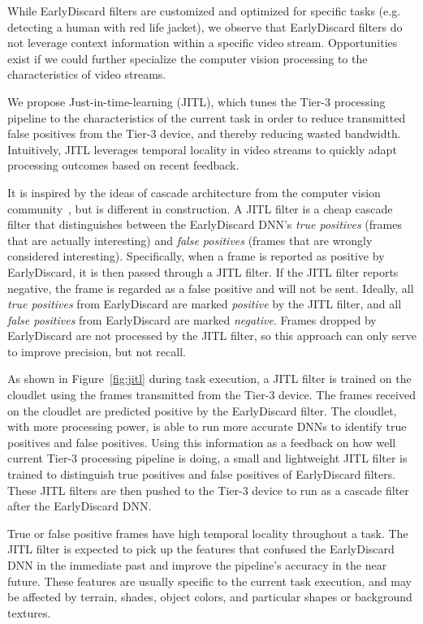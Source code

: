 While EarlyDiscard filters are customized and optimized for specific tasks (e.g.
detecting a human with red life jacket), we observe that EarlyDiscard filters do
not leverage context information within a specific video stream. Opportunities
exist if we could further specialize the computer vision processing to the
characteristics of video streams.

We propose Just-in-time-learning  (JITL), which tunes the Tier-3 processing
pipeline to the characteristics of the current task in order to reduce
transmitted false positives from the Tier-3 device, and thereby reducing wasted
bandwidth.  Intuitively, JITL leverages temporal locality in video streams to
quickly adapt processing outcomes based on recent feedback.

It is inspired by the ideas of cascade architecture from the computer vision
community~\cite{Viola2001}, but is different in construction. A JITL filter is a
cheap cascade filter that distinguishes between the EarlyDiscard DNN's
\emph{true positives} (frames that are actually interesting) and \emph{false
    positives} (frames that are wrongly considered interesting). Specifically, when
a frame is reported as positive by EarlyDiscard, it is then passed through a
JITL filter. If the JITL filter reports negative, the frame is regarded as a
false positive and will not be sent. Ideally, all \emph{true positives} from
EarlyDiscard are marked \emph{positive} by the JITL filter, and all \emph{false
    positives} from EarlyDiscard are marked \emph{negative}.  Frames dropped by
EarlyDiscard are not processed by the JITL filter, so this approach can only
serve to improve precision, but not recall.

As shown in Figure~\ref{fig:jitl} during task execution, a JITL filter is
trained on the cloudlet using the frames transmitted from the Tier-3 device.
The frames received on the cloudlet are predicted positive by the EarlyDiscard
filter. The cloudlet, with more processing power, is able to run more accurate
DNNs to identify true positives and false positives. Using this information as a
feedback on how well current Tier-3 processing pipeline is doing, a small and
lightweight JITL filter is trained to distinguish true positives and false
positives of EarlyDiscard filters. These JITL filters are then pushed to the
Tier-3 device to run as a cascade filter after the EarlyDiscard DNN.

True or false positive frames have high temporal locality throughout a task. The
JITL filter is expected to pick up the features that confused the EarlyDiscard
DNN in the immediate past and improve the pipeline's accuracy in the near
future. These features are usually specific to the current task execution, and
may be affected by terrain, shades, object colors, and particular shapes or
background textures.

